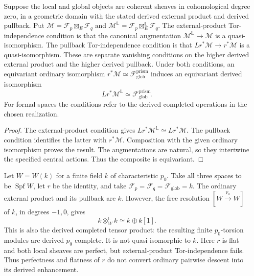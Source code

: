\begin{proposition}
\label{v4-arith:bcglue-core:prop:ordinary-derived-comparison}
Suppose the local and global objects are coherent sheaves in
cohomological degree zero, in a geometric domain with the stated
derived external product and derived pullback.
Put $\mathcal M=\mathcal F_p\boxtimes_E\mathcal F_q$ and
$\mathcal M^{\mathbb L}=\mathcal F_p\boxtimes_E^{\mathbb L}\mathcal F_q$.
The external-product Tor-independence condition is that the
canonical augmentation $\mathcal M^{\mathbb L}\to\mathcal M$
is a quasi-isomorphism. The pullback Tor-independence condition is
that $Lr^*\mathcal M\to r^*\mathcal M$ is a quasi-isomorphism.
These are separate vanishing conditions on the higher derived
external product and the higher derived pullback.
Under both conditions, an equivariant ordinary isomorphism
$r^*\mathcal M\simeq\mathcal F_{\mathrm{glob}}^{\mathrm{prism}}$
induces an equivariant derived isomorphism
\[
 Lr^*\mathcal M^{\mathbb L}
       \simeq\mathcal F_{\mathrm{glob}}^{\mathrm{prism}}.
\]
For formal spaces the conditions refer to the derived completed
operations in the chosen realization.
\end{proposition}

\begin{proof}
The external-product condition gives
$Lr^*\mathcal M^{\mathbb L}\simeq Lr^*\mathcal M$.
The pullback condition identifies the latter with $r^*\mathcal M$.
Composition with the given ordinary isomorphism proves the result.
The augmentations are natural, so they intertwine the specified
central actions. Thus the composite is equivariant.
\end{proof}

\begin{example}
\label{v4-arith:bcglue-core:ex:external-tor}
Let $W=W(k)$ for a finite field $k$ of characteristic $p_0$.
Take all three spaces to be $\operatorname{Spf}W$, let $r$ be
the identity, and take
$\mathcal F_p=\mathcal F_q=\mathcal F_{\mathrm{glob}}=k$.
The ordinary external product and its pullback are $k$.
However, the free resolution
$[W\xrightarrow{p_0}W]$ of $k$, in degrees $-1,0$, gives
\[
 k\otimes_W^{\mathbb L}k\simeq k\oplus k[1].
\]
This is also the derived completed tensor product: the resulting
finite $p_0$-torsion modules are derived $p_0$-complete.
It is not quasi-isomorphic to $k$.
Here $r$ is flat and both local sheaves are perfect, but
external-product Tor-independence fails.
Thus perfectness and flatness of $r$ do not convert ordinary
pairwise descent into its derived enhancement.
\end{example}

